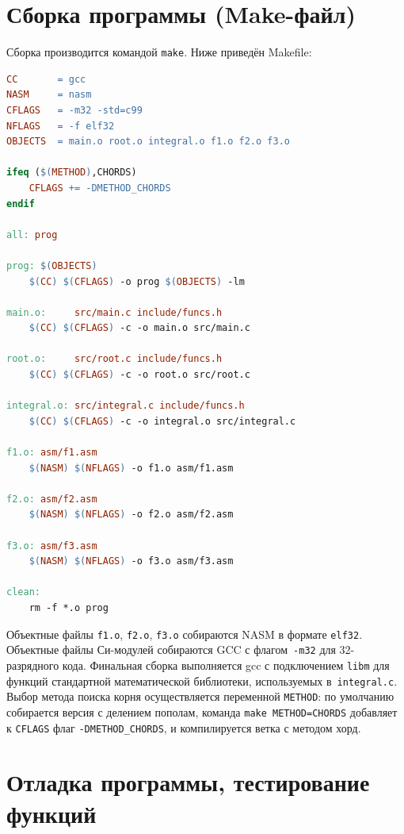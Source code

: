 \documentclass[a4paper,12pt,titlepage,finall]{article}
\begin{document}
\newpage

\section{Сборка программы (Make-файл)}

Сборка производится командой \texttt{make}. Ниже приведён Makefile:

\begin{lstlisting}[language=make,basicstyle=\ttfamily\small]
CC       = gcc
NASM     = nasm
CFLAGS   = -m32 -std=c99
NFLAGS   = -f elf32
OBJECTS  = main.o root.o integral.o f1.o f2.o f3.o

ifeq ($(METHOD),CHORDS)
    CFLAGS += -DMETHOD_CHORDS
endif

all: prog

prog: $(OBJECTS)
	$(CC) $(CFLAGS) -o prog $(OBJECTS) -lm

main.o:     src/main.c include/funcs.h
	$(CC) $(CFLAGS) -c -o main.o src/main.c

root.o:     src/root.c include/funcs.h
	$(CC) $(CFLAGS) -c -o root.o src/root.c

integral.o: src/integral.c include/funcs.h
	$(CC) $(CFLAGS) -c -o integral.o src/integral.c

f1.o: asm/f1.asm
	$(NASM) $(NFLAGS) -o f1.o asm/f1.asm

f2.o: asm/f2.asm
	$(NASM) $(NFLAGS) -o f2.o asm/f2.asm

f3.o: asm/f3.asm
	$(NASM) $(NFLAGS) -o f3.o asm/f3.asm

clean:
	rm -f *.o prog
\end{lstlisting}

Объектные файлы \texttt{f1.o}, \texttt{f2.o}, \texttt{f3.o} собираются NASM в формате
\texttt{elf32}. Объектные файлы Си-модулей собираются GCC с флагом~\texttt{-m32} для
32-разрядного кода. Финальная сборка выполняется gcc с подключением \texttt{libm} для
функций стандартной математической библиотеки, используемых в~\texttt{integral.c}.
Выбор метода поиска корня осуществляется переменной \texttt{METHOD}: по умолчанию
собирается версия с делением пополам, команда \texttt{make METHOD=CHORDS} добавляет
к \texttt{CFLAGS} флаг \texttt{-DMETHOD\_CHORDS}, и компилируется ветка с методом хорд.

\newpage

\section{Отладка программы, тестирование функций}
\end{document}
